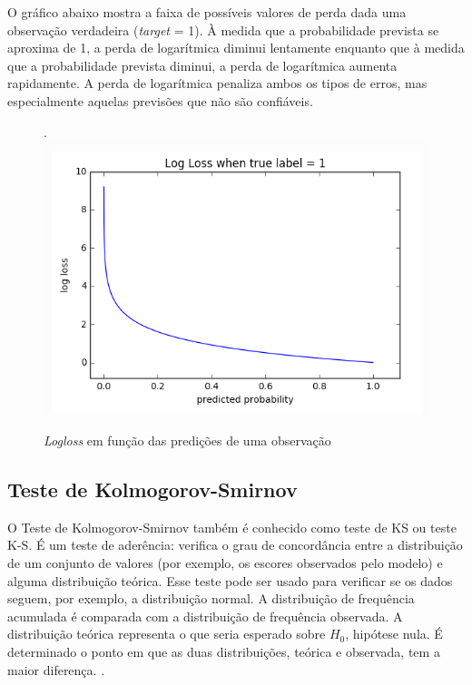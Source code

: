 O gráfico abaixo mostra a faixa de possíveis valores de perda dada uma observação verdadeira (\textit{target} = 1). À medida que a probabilidade prevista se aproxima de 1, a perda de logarítmica diminui lentamente enquanto que à medida que a probabilidade prevista diminui, a perda de logarítmica aumenta rapidamente. A perda de logarítmica penaliza ambos os tipos de erros, mas especialmente aquelas previsões que não são confiáveis.

\begin{figure}[H]
 \caption{\textit{Logloss} em função das predições de uma observação \cite{mlcheat:log}}.
 \label{fig:log_loss_gra}
 \centering
 \includegraphics[scale=0.5]{images/logloss_grap.png}
\end{figure}


\subsection{Teste de Kolmogorov-Smirnov}
O Teste de Kolmogorov-Smirnov \cite{kolmogorov,smirnov} também é conhecido como teste de KS ou teste K-S. É um teste de aderência: verifica o grau de concordância entre a distribuição de um conjunto de valores (por exemplo, os escores observados pelo modelo) e alguma distribuição teórica. Esse teste pode ser usado para verificar se os dados seguem, por exemplo, a distribuição normal. A distribuição de frequência acumulada é comparada com a distribuição de frequência observada. A distribuição teórica representa o que seria esperado sobre $H_0$, hipótese nula. É determinado o ponto em que as duas distribuições, teórica e observada, tem a maior diferença. \cite{nonparametric}. 

